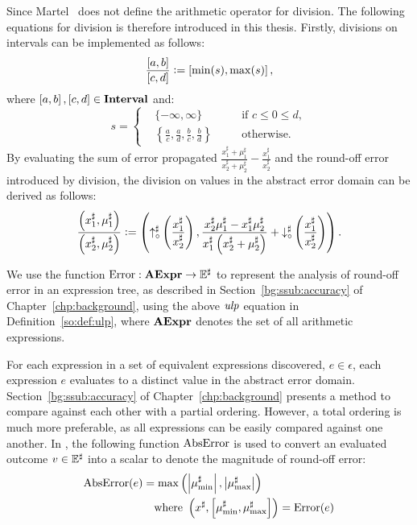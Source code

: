 Since Martel~\cite{martel07} does not define the arithmetic operator for
division.  The following equations for division is therefore introduced in this
thesis.  Firstly, divisions on intervals can be implemented as follows:
\begin{equation}
    \frac{\left[{a}, {b}\right]}{\left[{c}, {d}\right]}
        \vcentcolon= \left[{\min(s)}, {\max(s)}\right],
\end{equation}
where $\left[{a}, {b}\right], \left[{c}, {d}\right] \in \mathbf{Interval}$ and:
\begin{equation}
    s = \left\{
    \begin{aligned}
        & \{ -\infty, \infty \}
            && \text{if~} c \leq 0 \leq d, \\
        & \left\{
            \frac{a}{c}, \frac{a}{d}, \frac{b}{c}, \frac{b}{d}
        \right\}
            \quad && \text{otherwise}.
    \end{aligned}
    \right.
\end{equation}
By evaluating the sum of error propagated $\frac{ x^\sharp_1 + \mu^\sharp_1 }{
x^\sharp_2 + \mu^\sharp_2 } - \frac{x^\sharp_1}{x^\sharp_2}$ and the round-off
error introduced by division, the division on values in the abstract error
domain can be derived as follows:
\begin{equation}
    \frac{
        \left( x^\sharp_1, \mu^\sharp_1 \right)
    }{
        \left( x^\sharp_2, \mu^\sharp_2 \right)
    }
    \vcentcolon= \left(
            \operatorname{\uparrow^\sharp_\circ}\left(\frac{x^\sharp_1}{x^\sharp_2}\right),
            \frac{
                x^\sharp_2 \mu^\sharp_1 - x^\sharp_1 \mu^\sharp_2
            }{
                x^\sharp_1 \left( x^\sharp_2 + \mu^\sharp_2 \right)
            } + \operatorname{\downarrow^\sharp_\circ}\left(\frac{x^\sharp_1}{x^\sharp_2}\right)
        \right).
\end{equation}

We use the function $\operatorname{\mathrm{Error}}: \mathbf{AExpr}\to\mathbb{E}^\sharp$ to represent the
analysis of round-off error in an expression tree, as described in
Section~\ref{bg:ssub:accuracy} of Chapter~\ref{chp:background}, using the above
$\operatorname{\mathit{ulp}}$ equation in Definition~\ref{so:def:ulp}, where $\mathbf{AExpr}$ denotes the
set of all arithmetic expressions.

For each expression in a set of equivalent expressions discovered, $e \in
\epsilon$, each expression $e$ evaluates to a distinct value in the abstract
error domain.  Section~\ref{bg:ssub:accuracy} of Chapter~\ref{chp:background}
presents a method to compare against each other with a partial ordering.
However, a total ordering is much more preferable, as all expressions can
be easily compared against one another.  In \soap, the following function
$\operatorname{\mathrm{AbsError}}$ is used to convert an evaluated outcome $v \in \mathbb{E}^\sharp$ into a
scalar to denote the magnitude of round-off error:
\begin{equation}
    \begin{aligned}
        \operatorname{\mathrm{AbsError}}(e) &= \max\left(
            \left| \mu^\sharp_{\min} \right|,
            \left| \mu^\sharp_{\max} \right|
        \right) \\
        & \quad \text{where~}
        \left(
            x^\sharp, \left[ \mu^\sharp_{\min}, \mu^\sharp_{\max} \right]
        \right) = \operatorname{\mathrm{Error}}(e)
    \end{aligned}
    \label{so:eq:abserr}
\end{equation}
